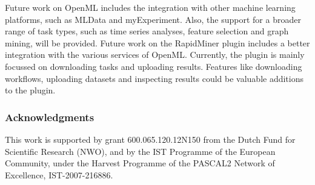 \documentclass[10pt, twoside]{article}
\begin{document}
Future work on OpenML includes the integration with other machine learning platforms, such as MLData and myExperiment. Also, the support for a broader range of task types, such as time series analyses, feature selection and graph mining, will be provided. Future work on the RapidMiner plugin includes a better integration with the various services of OpenML. Currently, the plugin is mainly focussed on downloading tasks and uploading results. Features like downloading workflows, uploading datasets and inspecting results could be valuable additions to the plugin. 

\subsubsection*{Acknowledgments}
This work is supported by grant 600.065.120.12N150 from the Dutch Fund for Scientific Research (NWO), and by the IST Programme of the European Community, under the Harvest Programme of the PASCAL2 Network of Excellence, IST-2007-216886.



\end{document}
